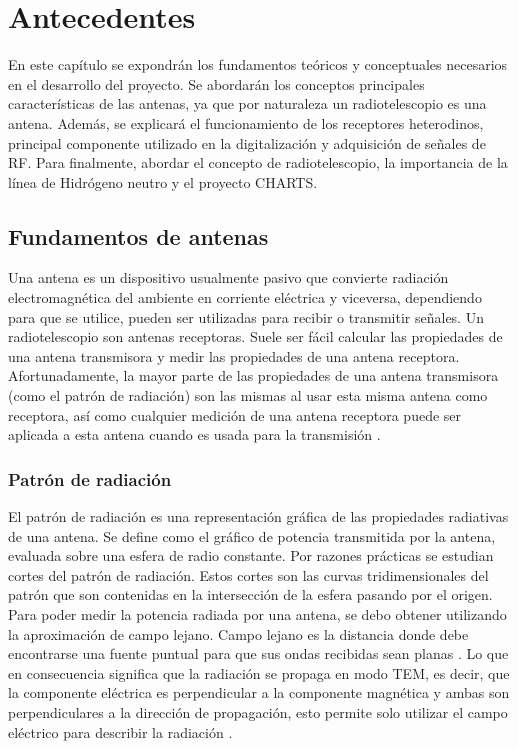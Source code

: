 \chapter{Antecedentes}

En este capítulo se expondrán los fundamentos teóricos y conceptuales necesarios en el desarrollo del proyecto. Se abordarán los conceptos principales características de las antenas, ya que por naturaleza un radiotelescopio es una antena. Además, se explicará el funcionamiento de los receptores heterodinos, principal componente utilizado en la digitalización y adquisición de señales de RF. Para finalmente, abordar el concepto de radiotelescopio, la importancia de la línea de Hidrógeno neutro y el proyecto CHARTS.\\

\section{Fundamentos de antenas}

Una antena es un dispositivo usualmente pasivo que convierte radiación electromagnética del ambiente en corriente eléctrica y viceversa, dependiendo para que se utilice, pueden ser utilizadas para recibir o transmitir señales. Un radiotelescopio son antenas receptoras. Suele ser fácil calcular las propiedades de una antena transmisora y medir las propiedades de una antena receptora. Afortunadamente, la mayor parte de las propiedades de una antena transmisora (como el patrón de radiación) son las mismas al usar esta misma antena como receptora, así como cualquier medición de una antena receptora puede ser aplicada a esta antena cuando es usada para la transmisión \cite{Ransom2016}.\\

\subsection{Patrón de radiación}

El patrón de radiación es una representación gráfica de las propiedades radiativas de una antena. Se define como el gráfico de potencia transmitida por la antena, evaluada sobre una esfera de radio constante. Por razones prácticas se estudian cortes del patrón de radiación. Estos cortes son las curvas tridimensionales del patrón que son contenidas en la intersección de la esfera pasando por el origen.\\

Para poder medir la potencia radiada por una antena, se debo obtener utilizando la aproximación de campo lejano. Campo lejano es la distancia donde debe encontrarse una fuente puntual para que sus ondas recibidas sean planas \cite{Ransom2016}. Lo que en consecuencia significa que la radiación se propaga en modo TEM, es decir, que la componente eléctrica es perpendicular a la componente magnética y ambas son perpendiculares a la dirección de propagación, esto permite solo utilizar el campo eléctrico para describir la radiación \cite{Astudillo2014}.\\

